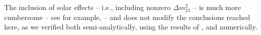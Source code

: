 \documentclass[aps,prd,onecolumn,nofootinbib,superscriptaddress, 11pt]{revtex4}
\begin{document}
The inclusion of solar effects -- i.e., including nonzero $\Delta m^2_{21}$ -- is much more cumbersome -- see for example, \cite{Denton:2016wmg} -- and does not modify the conclusions reached here, as we verified both semi-analytically, using the results of \cite{Denton:2016wmg}, and numerically. 


{}
\end{document}
